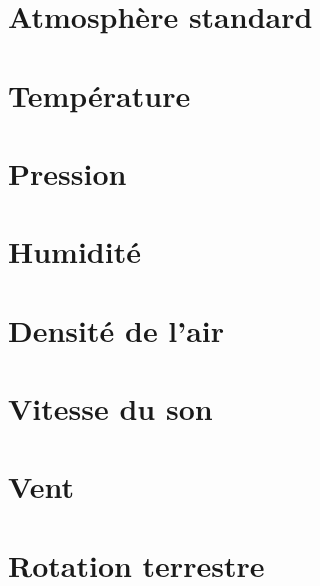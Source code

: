 \chapter{Atmosphère standard}


\chapter{Température}


\chapter{Pression}


\chapter{Humidité}


\chapter{Densité de l'air}


\chapter{Vitesse du son}


\chapter{Vent}


\chapter{Rotation terrestre}

